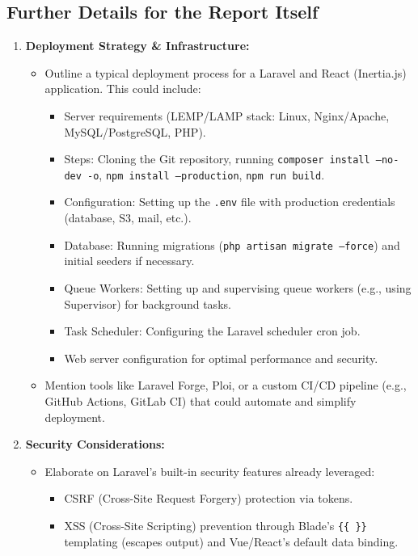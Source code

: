 \subsection*{Further Details for the Report Itself}

\begin{enumerate}
    \item \textbf{Deployment Strategy \& Infrastructure:}
    \begin{itemize}
        \item Outline a typical deployment process for a Laravel and React (Inertia.js) application. This could include:
        \begin{itemize}
            \item Server requirements (LEMP/LAMP stack: Linux, Nginx/Apache, MySQL/PostgreSQL, PHP).
            \item Steps: Cloning the Git repository, running \texttt{composer install --no-dev -o}, \texttt{npm install --production}, \texttt{npm run build}.
            \item Configuration: Setting up the \texttt{.env} file with production credentials (database, S3, mail, etc.).
            \item Database: Running migrations (\texttt{php artisan migrate --force}) and initial seeders if necessary.
            \item Queue Workers: Setting up and supervising queue workers (e.g., using Supervisor) for background tasks.
            \item Task Scheduler: Configuring the Laravel scheduler cron job.
            \item Web server configuration for optimal performance and security.
        \end{itemize}
        \item Mention tools like Laravel Forge, Ploi, or a custom CI/CD pipeline (e.g., GitHub Actions, GitLab CI) that could automate and simplify deployment.
    \end{itemize}
    \item \textbf{Security Considerations:}
    \begin{itemize}
        \item Elaborate on Laravel's built-in security features already leveraged:
        \begin{itemize}
            \item CSRF (Cross-Site Request Forgery) protection via tokens.
            \item XSS (Cross-Site Scripting) prevention through Blade's \texttt{\{\{ \}\}} templating (escapes output) and Vue/React's default data binding.

\end{itemize}
\end{itemize}
\end{enumerate}
